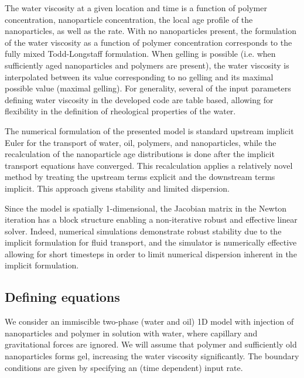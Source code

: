 The water viscosity at a given location and time is a function of polymer concentration, nanoparticle concentration, the local age profile of the nanoparticles, as well as the rate. With no nanoparticles present, the formulation of the water viscosity as a function of polymer concentration corresponds to the fully mixed Todd-Longstaff formulation. When gelling is possible (i.e. when sufficiently aged nanoparticles and polymers are present), the water viscosity is interpolated between its value corresponding to no gelling and its maximal possible value (maximal gelling).  For generality, several of the input parameters defining water viscosity in the developed code are table based, allowing for flexibility in the definition of rheological properties of the water.

The numerical formulation of the presented model is standard upstream implicit Euler for the transport of water, oil, polymers, and nanoparticles, while the recalculation of the nanoparticle age distributions is done after the implicit transport equations have converged. This recalculation applies a relatively novel method \citep{Flatten2008} by treating the upstream terms explicit and the downstream terms implicit. This approach givens stability and limited dispersion. 

Since the model is spatially 1-dimensional, the Jacobian matrix in the Newton iteration has a block structure enabling a non-iterative robust and effective linear solver. Indeed, numerical simulations demonstrate robust stability due to the implicit formulation for fluid transport, and the simulator is numerically effective allowing for short timesteps in order to limit numerical dispersion inherent in the implicit formulation.

\subsection{Defining equations}
We consider an immiscible two-phase (water and oil) 1D model with injection of nanoparticles and polymer in solution with water, where capillary and gravitational forces are ignored. We will assume that polymer and sufficiently old nanoparticles forms gel, increasing the water viscosity significantly. The boundary conditions are given by specifying an (time dependent) input rate. 

